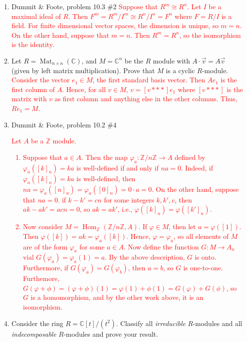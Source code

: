 \documentclass[12pt]{article}
\newcommand{\bbC}{\mathbb{C}}
\newcommand{\bbZ}{\mathbb{Z}}
\newcommand{\solution}[1]{\textcolor{red}{#1}}
\begin{document}
\pagestyle{fancy}


\begin{enumerate}
\item Dummit \& Foote, problem 10.3 \#2
\solution{
Suppose that $R^m \cong R^n$. Let $I$ be a maximal ideal of $R$. Then
$F^m=R^m/I^m \cong R^n/I^n =F^n$ where $F=R/I$ is a field. For finite
dimensional vector spaces, the dimension is unique, so $m=n$. On the
other hand, suppose that $m=n$. Then $R^m=R^n$, so the isomorphism is
the identity. } 
\item Let $R=\operatorname{Mat}_{n\times n}(\bbC)$, and $M=\bbC^n$
  be the $R$ module with $A\cdot \vec{v} = A\vec{v}$ (given by left
  matrix multiplication). Prove that $M$ is a cyclic $R$-module.
\solution{
Consider the vector $e_1 \in M$, the first standard basis vector. Then
$Ae_1$ is the first column of $A$. Hence, for all $v\in M$, $v=[v * * *]e_1$ where $[v *
* * ]$ is the matrix with $v$ as first column and anything else in the
other columns. Thus, $Re_1 = M$. }
\item Dummit \& Foote, problem 10.2 \#4
\solution{
Let $A$ be a $\bbZ$ module.
\begin{enumerate}
\item Suppose that $a\in A$. Then the map $\varphi_a:
  \bbZ/n\bbZ\rightarrow A$ defined by $\varphi_a([k]_n) = ka$ is
  well-defined if and only if $na=0$. Indeed, if $\varphi_a([k]_n)=ka$
  is well-defined, then $na=\varphi_a([n]_n)=\varphi_a([0]_n)=0\cdot
  a=0.$ On the other hand, suppose that $na=0$. if $k-k'=cn$ for some
  integers $k,k',c$, then $ak-ak'=acn = 0$, so $ak=ak'$, i.e.,
  $\varphi([k]_n)=\varphi([k']_n)$. 
\item Now consider $M=\operatorname{Hom}_\bbZ(\bbZ/n\bbZ, A)$. If $\varphi\in M$,
  then let $a=\varphi([1])$. Then $\varphi([k]) = ak =
  \varphi_a([k])$. Hence, $\varphi=\varphi_a$, so all elements of $M$
  are of the form $\varphi_a$ for some $a\in A$. Now define the
  function $G: M\rightarrow A_n$ vial $G(\varphi_a) =
  \varphi_a(1)=a$. By the above description, $G$ is onto. Furthermore,
  if $G(\varphi_a)=G(\varphi_b)$, then $a=b$, so $G$ is
  one-to-one. Furthemore, $G(\varphi+\phi)=(\varphi+\phi)(1) =
  \varphi(1)+\phi(1) = G(\varphi)+G(\phi)$, so $G$ is a homomorphism,
  and by the other work above, it is an isomorphism.
\end{enumerate}
}
\item Consider the ring $R=\bbC[t]/(t^2)$. Classify all
  \emph{irreducible} $R$-modules and all \emph{indecomposable}
  $R$-modules and prove your result.

\end{enumerate}
\end{document}
